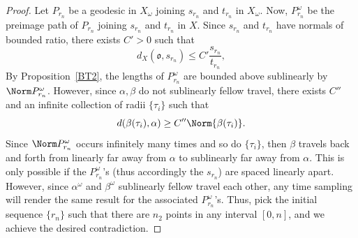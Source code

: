\documentclass[12 pt]{amsart}
\newcommand{\gothic}{\mathfrak}
\newcommand{\go}{{\gothic o}}
\theoremstyle{definition}
\theoremstyle{remark}
\begin{document}
\begin{proof}
Let $P_{r_{n}}$ be a geodesic in $X_\omega$ joining $s_{r_{n}}$ and $t_{r_{n}}$ in $X_\omega$. Now, $P_{r_{n}}^\omega$ be the preimage path of $P_{r_{n}}$ joining $s_{r_{n}}$ and $t_{r_{n}}$ in $X$.  Since $s_{r_{n}}$ and $t_{r_{n}}$ have normals of bounded ratio, there exists $C' >0$ such that 
\[d_X( \go,s_{r_{n}})  \leq C' \frac{s_{r_{n}}}{t_{r_{n}}}, \]
By Proposition~\ref{BT2}, the lengths of $P_{r_{n}}^\omega$ are bounded above sublinearly by $\Norm P_{r_{n}}^\omega$.
However, since $\alpha, \beta$ do not sublinearly fellow travel, there exists $C''$ and an infinite collection of radii $\{\tau_i\}$ such that 
\[ d(\beta(\tau_i), \alpha) \geq C'' \Norm {\beta(\tau_i)}. \]
Since $\Norm P_{r_{n}}^\omega$ occurs infinitely many times and so do $\{\tau_i\}$, then $\beta$ travels back and forth from linearly far away from $\alpha$ to sublinearly far away from $\alpha$. This is only possible if the $P_{r_{n}}^\omega$'s (thus accordingly the $s_{r_n}$) are spaced linearly apart. However, since $\alpha^\omega$ and $\beta^\omega$ sublinearly fellow travel each other, any time sampling will render the same result for the associated $P_{r_{n}}^\omega$'s. Thus, pick the initial sequence $\{r_n\}$ such that there are $n_2$ points in any interval $[0, n]$, and we achieve the desired contradiction. 

\end{proof} 
\end{document}

